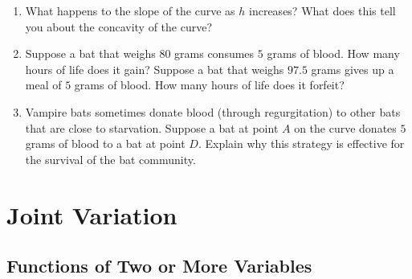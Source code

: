 \documentclass[10pt,]{book}
\theoremstyle{plain}
\theoremstyle{definition}
\theoremstyle{definition}
\theoremstyle{definition}
\theoremstyle{definition}
\theoremstyle{definition}
\numberwithin{equation}{section}
\begin{document}
\begin{enumerate}
\begin{figure}
\end{figure}
\item\hypertarget{li-557}{}
        What happens to the slope of the curve as \(h\) increases? What does this tell you about the concavity of the curve?
    \item\hypertarget{li-558}{}
        Suppose a bat that weighs \(80\) grams consumes \(5\) grams of blood. How many hours of life does it gain? Suppose a bat that weighs \(97.5\) grams gives up a meal of \(5\) grams of blood. How many hours of life does it forfeit?
    \item\hypertarget{li-559}{}
        Vampire bats sometimes donate blood (through regurgitation) to other bats that are close to starvation. Suppose a bat at point \(A\) on the curve donates \(5\) grams of blood to a bat at point \(D\). Explain why this strategy is effective for the survival of the bat community.
    \end{enumerate}
\typeout{************************************************}
\typeout{************************************************}
\section[Joint Variation]{Joint Variation}\label{Joint-Variation}
\typeout{************************************************}
\typeout{************************************************}
\subsection[Functions of Two or More Variables]{Functions of Two or More Variables}\label{subsection-81}
\end{document}
